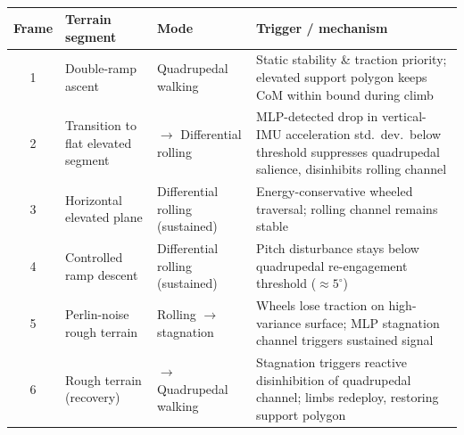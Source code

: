 
\begin{table}[htbp]
\centering
\caption{}
\label{tab:terrain_sequence}
\begin{tabularx}{\textwidth}{c l l X}
\toprule
\textbf{Frame} & \textbf{Terrain segment} & \textbf{Mode} & \textbf{Trigger / mechanism} \\
\midrule
1 & Double-ramp ascent & Quadrupedal walking & Static stability \& traction priority; elevated support polygon keeps CoM within bound during climb \\
2 & Transition to flat elevated segment & $\rightarrow$ Differential rolling & MLP-detected drop in vertical-IMU acceleration std.\ dev.\ below threshold suppresses quadrupedal salience, disinhibits rolling channel \\
3 & Horizontal elevated plane & Differential rolling (sustained) & Energy-conservative wheeled traversal; rolling channel remains stable \\
4 & Controlled ramp descent & Differential rolling (sustained) & Pitch disturbance stays below quadrupedal re-engagement threshold ($\approx 5^{\circ}$) \\
5 & Perlin-noise rough terrain & Rolling $\rightarrow$ stagnation & Wheels lose traction on high-variance surface; MLP stagnation channel triggers sustained signal \\
6 & Rough terrain (recovery) & $\rightarrow$ Quadrupedal walking & Stagnation triggers reactive disinhibition of quadrupedal channel; limbs redeploy, restoring support polygon \\
\bottomrule
\end{tabularx}
\end{table}

